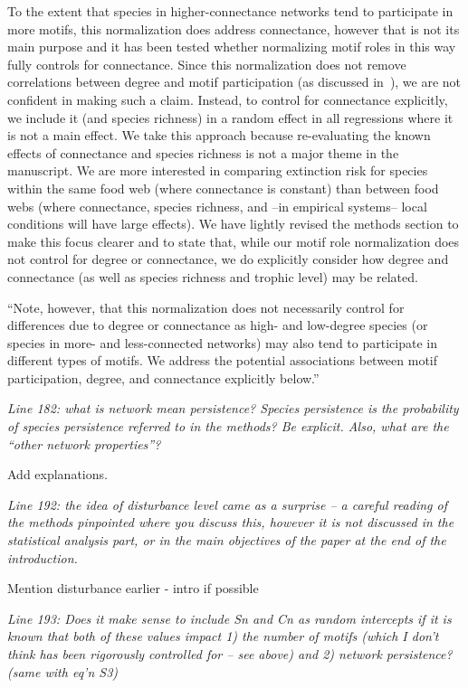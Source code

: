 \documentclass[12pt]{article}
\newcommand{\us}{\rm \setlength{\leftskip}{0.3cm} \setlength{\rightskip}{0.3cm}}
\newcommand{\them}{\it \setlength{\leftskip}{0cm} \setlength{\rightskip}{0cm}}
\begin{document}
\us To the extent that species in higher-connectance networks tend to participate in more motifs, this normalization does address connectance, however that is not its main purpose and it has been tested whether normalizing motif roles in this way fully controls for connectance.
Since this normalization does not remove correlations between degree and motif participation (as discussed in~\citealp[]{Cirtwill2021_inprep}), we are not confident in making such a claim.
Instead, to control for connectance explicitly, we include it (and species richness) in a random effect in all regressions where it is not a main effect. 
We take this approach because re-evaluating the known effects of connectance and species richness is not a major theme in the manuscript.
We are more interested in comparing extinction risk for species within the same food web (where connectance is constant) than between food webs (where connectance, species richness, and --in empirical systems-- local conditions will have large effects).
We have lightly revised the methods section to make this focus clearer and to state that, while our motif role normalization does not control for degree or connectance, we do explicitly consider how degree and connectance (as well as species richness and trophic level) may be related. 



    ``Note, however, that this normalization does not necessarily control for differences due to degree or connectance as high- and low-degree species (or species in more- and less-connected networks) may also tend to participate in different types of motifs.
    We address the potential associations between motif participation, degree, and connectance explicitly below.''


\them
Line 182: what is network mean persistence? Species persistence is the probability of species persistence referred to in the methods? Be explicit. Also, what are the “other network properties”?

\us
Add explanations.

\them
Line 192: the idea of disturbance level came as a surprise – a careful reading of the methods pinpointed where you discuss this, however it is not discussed in the statistical analysis part, or in the main objectives of the paper at the end of the introduction.

\us Mention disturbance earlier - intro if possible

\them
Line 193: Does it make sense to include Sn and Cn as random intercepts if it is known that both of these values impact 1) the number of motifs (which I don’t think has been rigorously controlled for – see above) and 2) network persistence? (same with eq’n S3)
\end{document}
